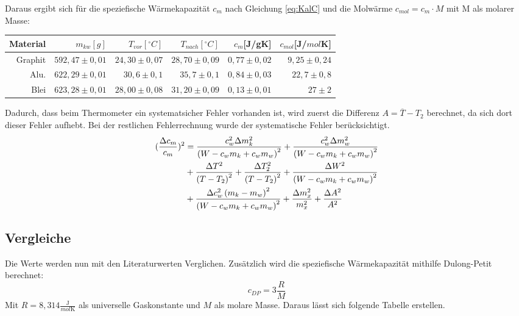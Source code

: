 Daraus ergibt sich für die speziefische Wärmekapazität $c_m$ nach Gleichung \ref{eq:KalC} und die Molwärme $c_{mol} = c_m\cdot M$ mit M als molarer Masse:

\begin{table}[h!]
    \centering
    \begin{tabular}{r r r r r r}
        \toprule
        Material & $m_{kw}[g]$& $T_{vor} [^\circ C] $&  $T_{nach}[^\circ C] $& $c_m$[J/gK] & $c_{mol}$[J/$mol$K] \\
        \midrule
        Graphit & $592,47 \pm 0,01 $ & $24,30 \pm 0,07$ & $28,70 \pm 0,09$ & $0,77 \pm 0,02 $ & $9,25\pm0,24$\\
        Alu. &$622,29 \pm 0,01$ &$30,6 \pm 0,1 $&$ 35,7 \pm0,1$& $0,84 \pm 0,03$ & $22,7 \pm 0,8$\\
        Blei & $ 623,28 \pm 0,01$ & $28,00 \pm 0,08$& $31,20 \pm 0,09$ & $0,13 \pm 0,01$ & $27 \pm 2$\\
        
    \end{tabular}
\end{table}
Dadurch, dass beim Thermometer ein systematsicher Fehler vorhanden ist, wird zuerst die Differenz $A = \overline{T} - T_2$ berechnet, da sich dort dieser Fehler aufhebt.
Bei der restlichen Fehlerrechnung wurde der systematische Fehler berücksichtigt.
\begin{align}
    (\frac{\Delta c_m}{c_m})^2 &=\frac{c_{w}^{2} \Delta m_{k}^{2}}{\left(W - c_{w} m_{k} + c_{w} m_{w}\right)^{2}} + \frac{c_{w}^{2} \Delta m_{w}^{2}}{\left(W - c_{w} m_{k} + c_{w} m_{w}\right)^{2}} \notag \\
    & + \frac{\Delta T^{2}}{\left(T - T_{2}\right)^{2}} + \frac{\Delta T_{2}^{2}}{\left(T - T_{2}\right)^{2}} + \frac{\Delta W^{2}}{\left(W - c_{w} m_{k} + c_{w} m_{w}\right)^{2}}\notag \\
    & + \frac{\Delta c_{w}^{2} \left(m_{k} - m_{w}\right)^{2}}{\left(W - c_{w} m_{k} + c_{w} m_{w}\right)^{2}} + \frac{\Delta m_{x}^{2}}{m_{x}^{2}} + \frac{\Delta A^{2}}{A^{2}}\notag\\
\end{align}

\subsection{Vergleiche}
Die Werte werden nun mit den Literaturwerten Verglichen. Zusätzlich wird die speziefische Wärmekapazität
mithilfe Dulong-Petit berechnet:
\begin{equation}
    c_{DP} = 3 \frac{R}{M}
\end{equation}
Mit $R = 8,314 \frac{\text{J}}{mol \text{K}}$ als universelle Gaskonstante und $M$ als molare Masse. Daraus
lässt sich folgende Tabelle erstellen.

